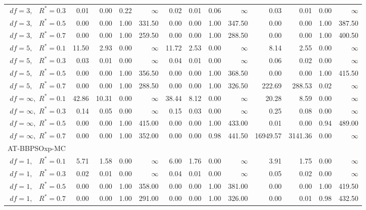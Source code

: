 \documentclass[12pt]{article}
\begin{document}
\begin{table}[ht]
{\begin{tabular}{r|rrrr|rrrr|rrrr}
  $df = 3,\enspace$ $R^* =0.3$ & 0.01 & 0.00 & 0.22 & $\infty$ & 0.02 & 0.01 & 0.06 & $\infty$ & 0.03 & 0.01 & 0.00 & $\infty$ \\ 
  $df = 3,\enspace$ $R^* =0.5$ & 0.00 & 0.00 & 1.00 & 331.50 & 0.00 & 0.00 & 1.00 & 347.50 & 0.00 & 0.00 & 1.00 & 387.50 \\ 
  $df = 3,\enspace$ $R^* =0.7$ & 0.00 & 0.00 & 1.00 & 259.50 & 0.00 & 0.00 & 1.00 & 288.50 & 0.00 & 0.00 & 1.00 & 400.50 \\ 
  $df = 5,\enspace$ $R^* =0.1$ & 11.50 & 2.93 & 0.00 & $\infty$ & 11.72 & 2.53 & 0.00 & $\infty$ & 8.14 & 2.55 & 0.00 & $\infty$ \\ 
  $df = 5,\enspace$ $R^* =0.3$ & 0.03 & 0.01 & 0.00 & $\infty$ & 0.04 & 0.01 & 0.00 & $\infty$ & 0.06 & 0.02 & 0.00 & $\infty$ \\ 
  $df = 5,\enspace$ $R^* =0.5$ & 0.00 & 0.00 & 1.00 & 356.50 & 0.00 & 0.00 & 1.00 & 368.50 & 0.00 & 0.00 & 1.00 & 415.50 \\ 
  $df = 5,\enspace$ $R^* =0.7$ & 0.00 & 0.00 & 1.00 & 288.50 & 0.00 & 0.00 & 1.00 & 326.50 & 222.69 & 288.53 & 0.02 & $\infty$ \\ 
  $df = \infty,$ $R^* =0.1$ & 42.86 & 10.31 & 0.00 & $\infty$ & 38.44 & 8.12 & 0.00 & $\infty$ & 20.28 & 8.59 & 0.00 & $\infty$ \\ 
  $df = \infty,$ $R^* =0.3$ & 0.14 & 0.05 & 0.00 & $\infty$ & 0.15 & 0.03 & 0.00 & $\infty$ & 0.25 & 0.08 & 0.00 & $\infty$ \\ 
  $df = \infty,$ $R^* =0.5$ & 0.00 & 0.00 & 1.00 & 415.00 & 0.00 & 0.00 & 1.00 & 433.00 & 0.01 & 0.00 & 0.94 & 489.00 \\ 
  $df = \infty,$ $R^* =0.7$ & 0.00 & 0.00 & 1.00 & 352.00 & 0.00 & 0.00 & 0.98 & 441.50 & 16949.57 & 3141.36 & 0.00 & $\infty$ \\ 
\hline
\multicolumn{1}{l|}{AT-BBPSOxp-MC} &&&&&&&&&&&&\\
  $df = 1,\enspace$ $R^* =0.1$ & 5.71 & 1.58 & 0.00 & $\infty$ & 6.00 & 1.76 & 0.00 & $\infty$ & 3.91 & 1.75 & 0.00 & $\infty$ \\ 
  $df = 1,\enspace$ $R^* =0.3$ & 0.02 & 0.01 & 0.00 & $\infty$ & 0.04 & 0.01 & 0.00 & $\infty$ & 0.05 & 0.02 & 0.00 & $\infty$ \\ 
  $df = 1,\enspace$ $R^* =0.5$ & 0.00 & 0.00 & 1.00 & 358.00 & 0.00 & 0.00 & 1.00 & 381.00 & 0.00 & 0.00 & 1.00 & 419.50 \\ 
  $df = 1,\enspace$ $R^* =0.7$ & 0.00 & 0.00 & 1.00 & 291.00 & 0.00 & 0.00 & 1.00 & 326.00 & 0.00 & 0.01 & 0.98 & 432.50 \\ 

\end{tabular}}
\end{table}
\end{document}
